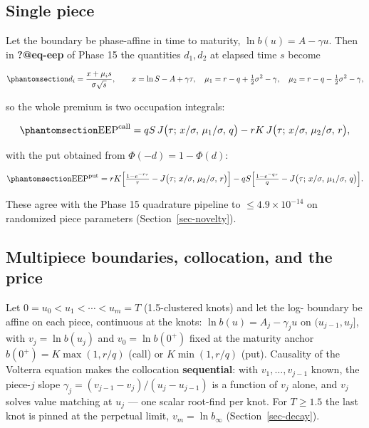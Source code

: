 \documentclass[
  english,
  10pt,
  letterpaper,
  DIV=11,
  numbers=noendperiod]{scrartcl}
\begin{document}
\subsection{Single piece}\label{single-piece}

Let the boundary be phase-affine in time to maturity,
\(\ln b(u)=A-\gamma u\). Then in \textbf{?@eq-eep} of Phase 15 the
quantities \(d_1,d_2\) at elapsed time \(s\) become

\begin{equation}\protect\phantomsection\label{eq-di}{
d_i=\frac{x+\mu_i s}{\sigma\sqrt s},\qquad
x=\ln S-A+\gamma\tau,\quad
\mu_1=r-q+\tfrac12\sigma^2-\gamma,\quad
\mu_2=r-q-\tfrac12\sigma^2-\gamma,
}\end{equation}

so the whole premium is two occupation integrals:

\begin{equation}\protect\phantomsection\label{eq-eepaffine-call}{
\mathrm{EEP}^{\mathrm{call}}
= qS\,J\big(\tau;\,x/\sigma,\,\mu_1/\sigma,\,q\big)
-rK\,J\big(\tau;\,x/\sigma,\,\mu_2/\sigma,\,r\big),
}\end{equation}

with the put obtained from \(\Phi(-d)=1-\Phi(d)\):

\begin{equation}\protect\phantomsection\label{eq-eepaffine-put}{
\mathrm{EEP}^{\mathrm{put}}
= rK\Big[\tfrac{1-e^{-r\tau}}{r}
-J\big(\tau;\,x/\sigma,\,\mu_2/\sigma,\,r\big)\Big]
- qS\Big[\tfrac{1-e^{-q\tau}}{q}
-J\big(\tau;\,x/\sigma,\,\mu_1/\sigma,\,q\big)\Big].
}\end{equation}

These agree with the Phase 15 quadrature pipeline to
\(\le4.9\times10^{-14}\) on randomized piece parameters
(Section~\ref{sec-novelty}).

\subsection{Multipiece boundaries, collocation, and the
price}\label{sec-price}

Let \(0=u_0<u_1<\cdots<u_m=T\) (1.5-clustered knots) and let the log-
boundary be affine on each piece, continuous at the knots:
\(\ln b(u)=A_j-\gamma_j u\) on \((u_{j-1},u_j]\), with
\(v_j=\ln b(u_j)\) and \(v_0=\ln b(0^+)\) fixed at the maturity anchor
\(b(0^+)=K\max(1,r/q)\) (call) or \(K\min(1,r/q)\) (put). Causality of
the Volterra equation makes the collocation \textbf{sequential}: with
\(v_1,\ldots,v_{j-1}\) known, the piece-\(j\) slope
\(\gamma_j=(v_{j-1}-v_j)/(u_j-u_{j-1})\) is a function of \(v_j\) alone,
and \(v_j\) solves value matching at \(u_j\) --- one scalar root-find
per knot. For \(T\ge1.5\) the last knot is pinned at the perpetual
limit, \(v_m=\ln b_\infty\) (Section~\ref{sec-decay}).
\end{document}
